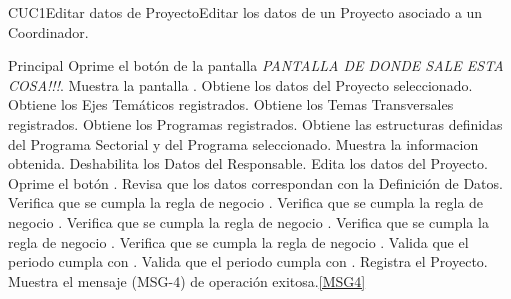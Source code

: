 	\begin{UseCase}{CUC1}{Editar datos de Proyecto}{Editar los datos de un Proyecto asociado a un Coordinador.}
	\end{UseCase}

	\begin{UCtrayectoria}{Principal}
			\UCpaso[\UCactor] Oprime el botón  de la pantalla \textit{PANTALLA DE DONDE SALE ESTA COSA!!!}.
			\UCpaso Muestra la pantalla .
			\UCpaso Obtiene los datos del Proyecto seleccionado.
			\UCpaso Obtiene los Ejes Temáticos registrados.
			\UCpaso Obtiene los Temas Transversales registrados.
			\UCpaso Obtiene los Programas registrados.
			\UCpaso Obtiene las estructuras definidas del Programa Sectorial y del Programa seleccionado.
			\UCpaso Muestra la informacion obtenida. 
			\UCpaso Deshabilita los Datos del Responsable.
			\UCpaso [\UCactor] Edita los datos del Proyecto.\label{paso:CUC1_IngresaDatosProyecto} 
			\UCpaso [\UCactor] Oprime el botón .\label{paso:CUC1_OprimeAceptar}
			\UCpaso Revisa que los datos correspondan con la Definición de Datos. 
			\UCpaso Verifica que se cumpla la regla de negocio .
			\UCpaso Verifica que se cumpla la regla de negocio .
			\UCpaso Verifica que se cumpla la regla de negocio .
			\UCpaso Verifica que se cumpla la regla de negocio . 
			\UCpaso Verifica que se cumpla la regla de negocio . 
			\UCpaso Valida que el periodo cumpla con   .
			\UCpaso Valida que el periodo cumpla con   .
			\UCpaso Registra el Proyecto.
			\UCpaso Muestra el mensaje (MSG-4) de operación exitosa.\ref{MSG4}
	\end{UCtrayectoria}

